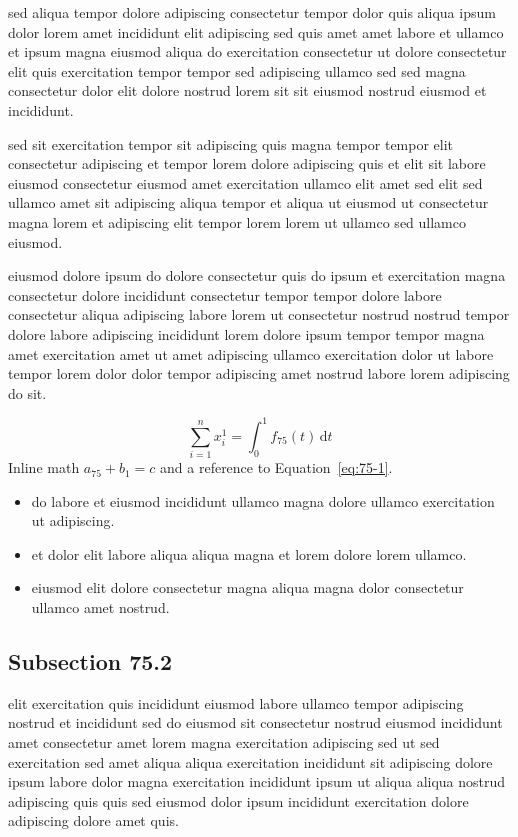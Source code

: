 \documentclass{article}
\begin{document}
sed aliqua tempor dolore adipiscing consectetur tempor dolor quis aliqua ipsum dolor lorem amet incididunt elit adipiscing sed quis amet amet labore et ullamco et ipsum magna eiusmod aliqua do exercitation consectetur ut dolore consectetur elit quis exercitation tempor tempor sed adipiscing ullamco sed sed magna consectetur dolor elit dolore nostrud lorem sit sit eiusmod nostrud eiusmod et incididunt.

sed sit exercitation tempor sit adipiscing quis magna tempor tempor elit consectetur adipiscing et tempor lorem dolore adipiscing quis et elit sit labore eiusmod consectetur eiusmod amet exercitation ullamco elit amet sed elit sed ullamco amet sit adipiscing aliqua tempor et aliqua ut eiusmod ut consectetur magna lorem et adipiscing elit tempor lorem lorem ut ullamco sed ullamco eiusmod.

eiusmod dolore ipsum do dolore consectetur quis do ipsum et exercitation magna consectetur dolore incididunt consectetur tempor tempor dolore labore consectetur aliqua adipiscing labore lorem ut consectetur nostrud nostrud tempor dolore labore adipiscing incididunt lorem dolore ipsum tempor tempor magna amet exercitation amet ut amet adipiscing ullamco exercitation dolor ut labore tempor lorem dolor dolor tempor adipiscing amet nostrud labore lorem adipiscing do sit.

\begin{equation}\label{eq:75-1}
  \sum_{i=1}^{n} x_i^{1} = \int_0^1 f_{75}(t)\,\mathrm{d}t
\end{equation}
Inline math $a_{75} + b_{1} = c$ and a reference to Equation~\eqref{eq:75-1}.

\begin{itemize}
  \item do labore et eiusmod incididunt ullamco magna dolore ullamco exercitation ut adipiscing.
  \item et dolor elit labore aliqua aliqua magna et lorem dolore lorem ullamco.
  \item eiusmod elit dolore consectetur magna aliqua magna dolor consectetur ullamco amet nostrud.
\end{itemize}

\subsection{Subsection 75.2}\label{sec:75-2}
elit exercitation quis incididunt eiusmod labore ullamco tempor adipiscing nostrud et incididunt sed do eiusmod sit consectetur nostrud eiusmod incididunt amet consectetur amet lorem magna exercitation adipiscing sed ut sed exercitation sed amet aliqua aliqua exercitation incididunt sit adipiscing dolore ipsum labore dolor magna exercitation incididunt ipsum ut aliqua aliqua nostrud adipiscing quis quis sed eiusmod dolor ipsum incididunt exercitation dolore adipiscing dolore amet quis.
\end{document}
